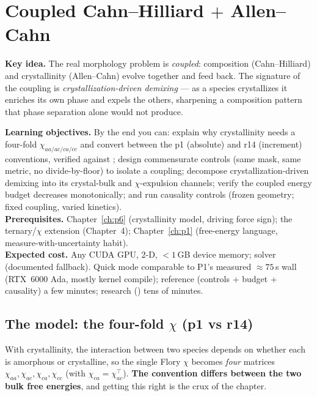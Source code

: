 \chapter{Coupled Cahn--Hilliard $+$ Allen--Cahn}
\label{ch:p7}

\begin{keybox}
\textbf{Key idea.} The real morphology problem is \emph{coupled}:
composition (Cahn--Hilliard) and crystallinity (Allen--Cahn) evolve
together and feed back. The signature of the coupling is
\emph{crystallization-driven demixing} --- as a species crystallizes it
enriches its own phase and expels the others, sharpening a composition
pattern that phase separation alone would not produce.
\end{keybox}

\begin{keybox}
\textbf{Learning objectives.} By the end you can: explain why
crystallinity needs a four-fold $\chi_{aa/ac/ca/cc}$ and convert between
the p1 (absolute) and r14 (increment) conventions, verified against
; design commensurate controls (same mask,
same metric, no divide-by-floor) to isolate a coupling; decompose
crystallization-driven demixing into its crystal-bulk and
$\chi$-expulsion channels; verify the coupled energy budget decreases
monotonically; and run causality controls (frozen geometry; fixed
coupling, varied kinetics).\\[2pt]
\textbf{Prerequisites.} Chapter~\ref{ch:p6} (crystallinity model, driving
force sign); the ternary/$\chi$ extension (Chapter~4); Chapter~\ref{ch:p1}
(free-energy language, measure-with-uncertainty habit).\\[2pt]
\textbf{Expected cost.} Any CUDA GPU, 2-D, $<1$\,GB device memory; solver
 (documented  fallback). Quick mode comparable to
P1's measured $\approx75$\,s wall (RTX~6000 Ada, mostly kernel compile);
reference (controls + budget + causality) a few minutes; research
() tens of minutes.
\end{keybox}

\section{The model: the four-fold $\chi$ (p1 vs r14)}

With crystallinity, the interaction between two species depends on whether
each is amorphous or crystalline, so the single Flory $\chi$ becomes
\emph{four} matrices $\chi_{aa},\chi_{ac},\chi_{ca},\chi_{cc}$ (with
$\chi_{ca}=\chi_{ac}^{\!\top}$). \textbf{The convention differs between the
two bulk free energies}, and getting this right is the crux of the chapter.

